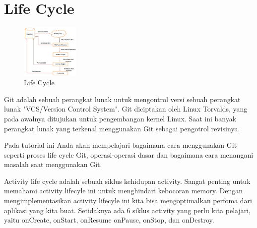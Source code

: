 \sloppy
\section{Life Cycle}
\begin{figure}[ht]
	\centerline{\includegraphics[width=0.25\textwidth]{Figures/git_life_cycle}}
	\caption{Life Cycle}
	\label{lifecycle}
\end{figure}
\vspace{12pt}
\noindent 
Git adalah sebuah perangkat lunak untuk mengontrol versi sebuah perangkat lunak "VCS/Version Control System". Git diciptakan oleh Linux Torvalds, yang pada awalnya ditujukan untuk pengembangan kernel Linux. Saat ini banyak perangkat lunak yang terkenal menggunakan Git sebagai pengotrol revisinya. \par
\vspace{12pt}
\noindent 
Pada tutorial ini Anda akan mempelajari bagaimana cara menggunakan Git seperti proses life cycle Git, operasi-operasi dasar dan bagaimana cara menangani masalah saat menggunakan Git. \par
\vspace{12pt}
\noindent 
Activity life cycle adalah sebuah siklus kehidupan activity. Sangat penting untuk memahami activity lifecyle ini untuk menghindari kebocoran memory. Dengan mengimplementasikan activity lifecyle ini kita bisa mengoptimalkan perfoma dari aplikasi yang kita buat. Setidaknya ada 6 siklus activity yang perlu kita pelajari, yaitu $  $onCreate, onStart, onResume onPause, onStop, dan onDestroy.
